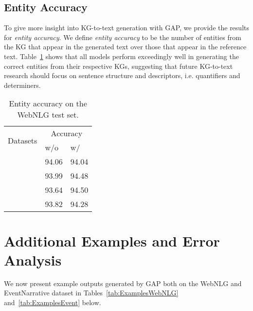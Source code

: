 \documentclass[11pt]{article}
\begin{document}
\subsection{Entity Accuracy}
To give more insight into KG-to-text generation with GAP, we provide the results for \textit{entity accuracy}. We define \textit{entity accuracy} to be the number of entities from the KG that appear in the generated text over those that appear in the reference text. Table~\ref{tab:entacc} shows that all models perform exceedingly well in generating the correct entities from their respective KGs, suggesting that future KG-to-text research should focus on sentence structure and descriptors, i.e. quantifiers and determiners. 

\begin{table}[H]
\centering
\begin{tabular}{lll}
\hline
\multicolumn{1}{c}{\multirow{2}{*}{Datasets}} & \multicolumn{2}{c}{Accuracy}         \\ \cline{2-3} 
\multicolumn{1}{c}{}                          & w/o  & w/  \\ \hline
                                             & 94.06             & 94.04            \\ \hline
                                             & 93.99             & 94.48            \\ \hline
                                            & 93.64             & 94.50            \\ \hline
                                             & 93.82             & 94.28            \\ \hline
\end{tabular}
\caption{\label{tab:entacc} Entity accuracy on the WebNLG test set.}
\end{table}

\section{Additional Examples and Error Analysis}
\label{sec:generationexamples}
We now present example outputs generated by GAP both on the WebNLG and EventNarrative dataset in Tables~\ref{tab:ExamplesWebNLG} and~\ref{tab:ExamplesEvent} below. 
\end{document}
